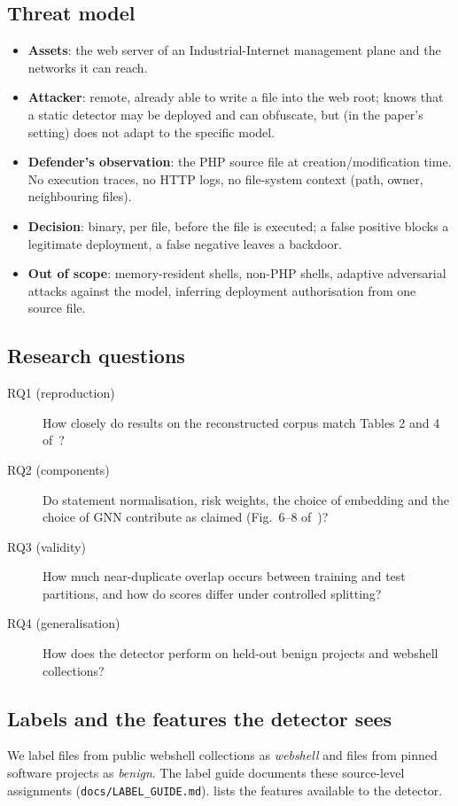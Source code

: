 \subsection{Threat model}
\begin{itemize}
  \item \textbf{Assets}: the web server of an Industrial-Internet management plane and the networks it can reach.
  \item \textbf{Attacker}: remote, already able to write a file into the web root; knows that a static detector may be
        deployed and can obfuscate, but (in the paper's setting) does not adapt to the specific model.
  \item \textbf{Defender's observation}: the PHP source file at creation/modification time. No execution traces,
        no HTTP logs, no file-system context (path, owner, neighbouring files).
  \item \textbf{Decision}: binary, per file, before the file is executed; a false positive blocks a legitimate
        deployment, a false negative leaves a backdoor.
  \item \textbf{Out of scope}: memory-resident shells, non-PHP shells, adaptive adversarial attacks against the model,
        inferring deployment authorisation from one source file.
\end{itemize}

\subsection{Research questions}
\begin{description}
  \item[RQ1 (reproduction)] How closely do results on the reconstructed corpus match Tables 2 and 4 of~\paperref{}?
  \item[RQ2 (components)] Do statement normalisation, risk weights, the choice of embedding and the choice of
        GNN contribute as claimed (Fig.~6--8 of~\paperref{})?
  \item[RQ3 (validity)] How much near-duplicate overlap occurs between training and test partitions, and how
        do scores differ under controlled splitting?
  \item[RQ4 (generalisation)] How does the detector perform on held-out benign projects and webshell collections?
\end{description}

\subsection{Labels and the features the detector sees}
We label files from public webshell collections as \emph{webshell} and files from pinned software projects
as \emph{benign}. The label guide documents these source-level assignments
(\texttt{docs/LABEL\_GUIDE.md}).  lists the features available to the detector.

